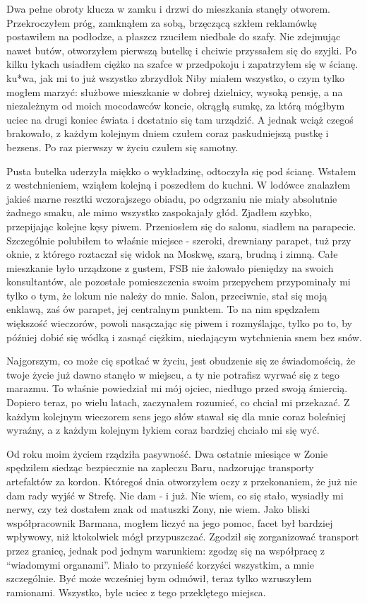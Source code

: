 \documentclass[../MAIN.tex]{subfiles}
\begin{document}
Dwa pełne obroty klucza w zamku i drzwi do mieszkania stanęły
otworem. Przekroczyłem próg, zamknąłem za sobą, brzęczącą
szkłem reklamówkę postawiłem na podłodze, a płaszcz rzuciłem
niedbale do szafy. Nie zdejmując nawet butów, otworzyłem
pierwszą butelkę i chciwie przyssałem się do szyjki. Po kilku
łykach usiadłem ciężko na szafce w przedpokoju i zapatrzyłem
się w ścianę. ku*wa, jak mi to już wszystko zbrzydło\3k Niby
miałem wszystko, o czym tylko mogłem marzyć: służbowe
mieszkanie w dobrej dzielnicy, wysoką pensję, a na niezależnym
od moich mocodawców koncie, okrągłą sumkę, za którą mógłbym
uciec na drugi koniec świata i dostatnio się tam urządzić. A
jednak wciąż czegoś brakowało, z każdym kolejnym dniem czułem
coraz paskudniejszą pustkę i bezsens. Po raz pierwszy w życiu
czułem się samotny.

Pusta butelka uderzyła miękko o wykładzinę, odtoczyła się pod
ścianę. Wstałem z westchnieniem, wziąłem kolejną i poszedłem do
kuchni. W lodówce znalazłem jakieś marne resztki wczorajszego
obiadu, po odgrzaniu nie miały absolutnie żadnego smaku, ale
mimo wszystko zaspokajały głód. Zjadłem szybko, przepijając
kolejne kęsy piwem. Przeniosłem się do salonu, siadłem na
parapecie. Szczególnie polubiłem to właśnie miejsce - szeroki,
drewniany parapet, tuż przy oknie, z którego roztaczał się
widok na Moskwę, szarą, brudną i zimną. Całe mieszkanie było
urządzone z gustem, FSB nie żałowało pieniędzy na swoich
konsultantów, ale pozostałe pomieszczenia swoim przepychem
przypominały mi tylko o tym, że lokum nie należy do mnie.
Salon, przeciwnie, stał się moją enklawą, zaś ów parapet, jej
centralnym punktem. To na nim spędzałem większość wieczorów,
powoli nasączając się piwem i rozmyślając, tylko po to, by
później dobić się wódką i zasnąć ciężkim, niedającym
wytchnienia snem bez snów.

Najgorszym, co może cię spotkać w życiu, jest obudzenie się ze
świadomością, że twoje życie już dawno stanęło w miejscu, a ty
nie potrafisz wyrwać się z tego marazmu. To właśnie powiedział
mi mój ojciec, niedługo przed swoją śmiercią. Dopiero teraz, po
wielu latach, zaczynałem rozumieć, co chciał mi przekazać. Z
każdym kolejnym wieczorem sens jego słów stawał się dla mnie
coraz boleśniej wyraźny, a z każdym kolejnym łykiem coraz
bardziej chciało mi się wyć.

Od roku moim życiem rządziła pasywność. Dwa ostatnie miesiące w
Zonie spędziłem siedząc bezpiecznie na zapleczu Baru,
nadzorując transporty artefaktów za kordon. Któregoś dnia
otworzyłem oczy z przekonaniem, że już nie dam rady wyjść w
Strefę. Nie dam - i już. Nie wiem, co się stało, wysiadły mi
nerwy, czy też dostałem znak od matuszki Zony, nie wiem. Jako
bliski współpracownik Barmana, mogłem liczyć na jego pomoc,
facet był bardziej wpływowy, niż ktokolwiek mógł przypuszczać.
Zgodził się zorganizować transport przez granicę, jednak pod
jednym warunkiem: zgodzę się na współpracę z “wiadomymi
organami”. Miało to przynieść korzyści wszystkim, a mnie
szczególnie. Być może wcześniej bym odmówił, teraz tylko
wzruszyłem ramionami. Wszystko, byle uciec z tego przeklętego
miejsca.
\end{document}
